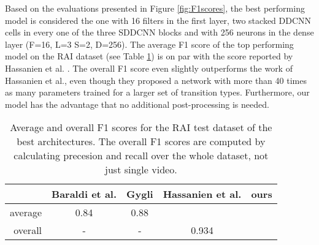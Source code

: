 Based on the evaluations presented in Figure \ref{fig:F1scores}, the best performing model is considered the one with 16 filters in the first layer, two stacked DDCNN cells in every one of the three SDDCNN blocks and with 256 neurons in the dense layer (F=16, L=3 S=2, D=256).
The average F1 score  of the top performing model on the RAI dataset (see Table \ref{tab:shotDetectors}) is on par with the score reported by Hassanien et al. \cite{Hassanien17}. The overall F1 score even slightly outperforms the work of Hassanien et al., even though they proposed a network with more than 40 times as many parameters trained for a larger set of transition types. Furthermore, our model has the advantage that no additional post-processing is needed.

\begin{table}[b]
    \centering
    \begin{tabular}{r|c|c|c|c}
        & Baraldi et al. & Gygli & Hassanien et al. & ours \\
        \hline
        average & 0.84 \cite{Baraldi15} & 0.88 \cite{Gygli18} &  \cite{Hassanien17} &  \\
        overall & - & - & 0.934 \cite{Hassanien17} &  \\
    \end{tabular}
    
    \caption{Average and overall F1 scores for the RAI test dataset of the best architectures. \textmd{The overall F1 scores are computed by calculating precesion and recall over the whole dataset, not just single video.
    }}
    \label{tab:shotDetectors}
\end{table}

